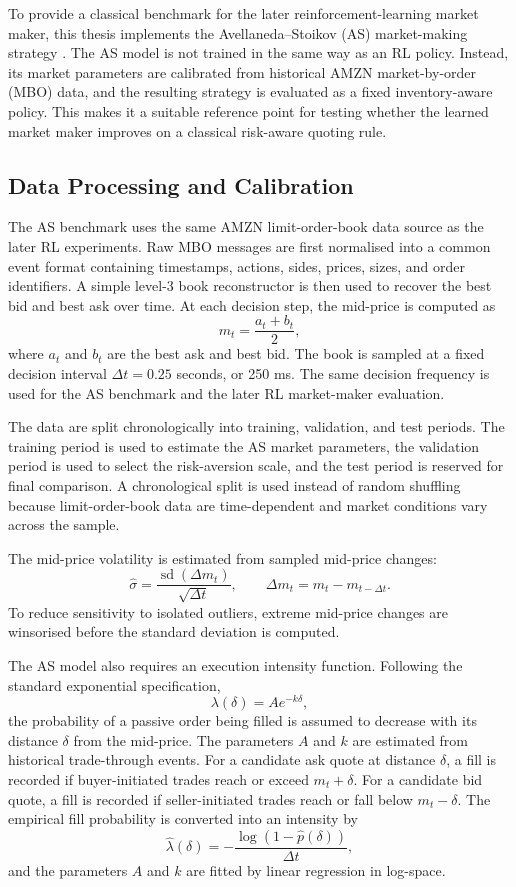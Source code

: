 \documentclass[oneside]{uva-inf-bachelor-thesis}
\begin{document}
To provide a classical benchmark for the later reinforcement-learning market maker,
this thesis implements the Avellaneda--Stoikov (AS) market-making strategy
\cite{avellaneda_high-frequency_2008}. The AS model is not trained in the same way as an RL policy.
Instead, its market parameters are calibrated from historical AMZN market-by-order
(MBO) data, and the resulting strategy is evaluated as a fixed inventory-aware policy.
This makes it a suitable reference point for testing whether the learned market maker
improves on a classical risk-aware quoting rule.

\subsection{Data Processing and Calibration}

The AS benchmark uses the same AMZN limit-order-book data source as the later RL
experiments. Raw MBO messages are first normalised into a common event format
containing timestamps, actions, sides, prices, sizes, and order identifiers. A simple
level-3 book reconstructor is then used to recover the best bid and best ask over time.
At each decision step, the mid-price is computed as
\[
    m_t = \frac{a_t+b_t}{2},
\]
where \(a_t\) and \(b_t\) are the best ask and best bid. The book is sampled at a fixed decision interval \(\Delta t=0.25\) seconds, or 250 ms. The same decision frequency is used for the AS benchmark and the later RL market-maker evaluation.

The data are split chronologically into training, validation, and test periods. The
training period is used to estimate the AS market parameters, the validation period
is used to select the risk-aversion scale, and the test period is reserved for final
comparison. A chronological split is used instead of random shuffling because
limit-order-book data are time-dependent and market conditions vary across the
sample.

The mid-price volatility is estimated from sampled mid-price changes:
\[
    \widehat{\sigma}
    =
    \frac{\operatorname{sd}(\Delta m_t)}{\sqrt{\Delta t}},
    \qquad
    \Delta m_t = m_t - m_{t-\Delta t}.
\]
To reduce sensitivity to isolated outliers, extreme mid-price changes are winsorised
before the standard deviation is computed.

The AS model also requires an execution intensity function. Following the standard
exponential specification,
\[
    \lambda(\delta) = A e^{-k\delta},
\]
the probability of a passive order being filled is assumed to decrease with its distance
\(\delta\) from the mid-price. The parameters \(A\) and \(k\) are estimated from
historical trade-through events. For a candidate ask quote at distance \(\delta\), a fill
is recorded if buyer-initiated trades reach or exceed \(m_t+\delta\). For a candidate
bid quote, a fill is recorded if seller-initiated trades reach or fall below \(m_t-\delta\).
The empirical fill probability is converted into an intensity by
\[
    \widehat{\lambda}(\delta)
    =
    -\frac{\log(1-\widehat{p}(\delta))}{\Delta t},
\]
and the parameters \(A\) and \(k\) are fitted by linear regression in log-space.
\end{document}
